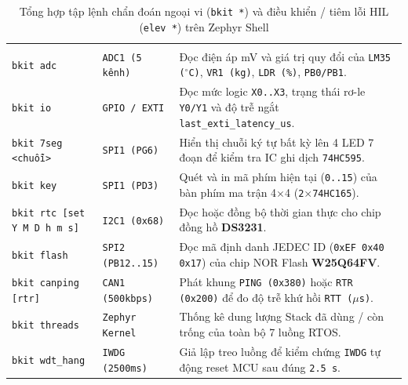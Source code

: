 \begingroup
\renewcommand{\arraystretch}{1.18}%
\setlength{\tabcolsep}{4.5pt}%
\fontsize{8.1}{10.4}\selectfont
{}%
\begin{xltabular}{\textwidth}{|L{4.1cm}|L{2.5cm}|Y|}
\caption{Tổng hợp tập lệnh chẩn đoán ngoại vi (\texttt{bkit *}) và điều khiển / tiêm lỗi HIL (\texttt{elev *}) trên Zephyr Shell}\label{tab:cli_commands}\\
\hline
{}
 &  &  \\
\hline
\endfirsthead
\hline
{}
 &  &  \\
\hline
\endhead
\hline
\endfoot
\hline
\endlastfoot
\texttt{bkit adc} & \texttt{ADC1 (5 kênh)} & Đọc điện áp mV và giá trị quy đổi của \texttt{LM35 ($^\circ$C)}, \texttt{VR1 (kg)}, \texttt{LDR (\%)}, \texttt{PB0/PB1}. \\
\hline
{}
\texttt{bkit io} & \texttt{GPIO / EXTI} & Đọc mức logic \texttt{X0..X3}, trạng thái rơ-le \texttt{Y0/Y1} và độ trễ ngắt \texttt{last\_exti\_latency\_us}. \\
\hline
\texttt{bkit 7seg <chuỗi>} & \texttt{SPI1 (PG6)} & Hiển thị chuỗi ký tự bất kỳ lên 4 LED 7 đoạn để kiểm tra IC ghi dịch \texttt{74HC595}. \\
\hline
{}
\texttt{bkit key} & \texttt{SPI1 (PD3)} & Quét và in mã phím hiện tại (\texttt{0..15}) của bàn phím ma trận 4$\times$4 (\texttt{2$\times$74HC165}). \\
\hline
\texttt{bkit rtc [set Y M D h m s]} & \texttt{I2C1 (0x68)} & Đọc hoặc đồng bộ thời gian thực cho chip đồng hồ \textbf{DS3231}. \\
\hline
{}
\texttt{bkit flash} & \texttt{SPI2 (PB12..15)} & Đọc mã định danh JEDEC ID (\texttt{0xEF 0x40 0x17}) của chip NOR Flash \textbf{W25Q64FV}. \\
\hline
\texttt{bkit canping [rtr]} & \texttt{CAN1 (500kbps)} & Phát khung \texttt{PING (0x380)} hoặc \texttt{RTR (0x200)} để đo độ trễ khứ hồi \texttt{RTT ($\mu$s)}. \\
\hline
{}
\texttt{bkit threads} & \texttt{Zephyr Kernel} & Thống kê dung lượng Stack đã dùng / còn trống của toàn bộ 7 luồng RTOS. \\
\hline
\texttt{bkit wdt\_hang} & \texttt{IWDG (2500ms)} & Giả lập treo luồng để kiểm chứng \texttt{IWDG} tự động reset MCU sau đúng \texttt{2.5~s}. \\

\end{xltabular}

